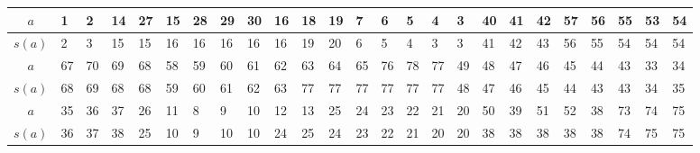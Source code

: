 \begin{center}
\begin{minipage}{\textwidth}
\renewcommand{\arraystretch}{1.2}
\begin{scriptsize}
\begin{tabular}{|c|*{24}{|p{.15cm}}|}
\hline
$a$&1&2&14&27&15&28&29&30&16&18&19&7&6&5&4&3&40&41&42&57&56&55&53&54 \\
\hline
$s(a)$&2&3&15&15&16&16&16&16&16&19&20&6&5&4&3&3&41&42&43&56&55&54&54&54\\
\hline \hline
$a$&67&70&69&68&58&59&60&61&62&63&64&65&76&78&77&49&48&47&46&45&44&43&33&34\\
\hline
$s(a)$&68&69&68&68&59&60&61&62&63&77&77&77&77&77&77&48&47&46&45&44&43&43&34&35\\
\hline \hline
$a$&35&36&37&26&11&8&9&10&12&13&25&24&23&22&21&20&50&39&51&52&38&73&74&75\\
\hline
$s(a)$&36&37&38&25&10&9&10&10&24&25&24&23&22&21&20&20&38&38&38&38&38&74&75&75\\
\hline
\end{tabular}
\label{Beispiel_HF_Zickzack_mit_Hubausrichtung}
\end{scriptsize} 
\renewcommand{\arraystretch}{1}


\end{minipage}
\end{center}
